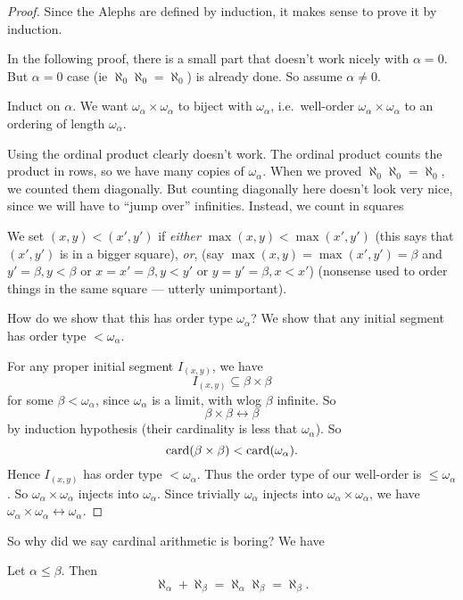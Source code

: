 \documentclass[a4paper]{article}
\begin{document}
\begin{proof}
  Since the Alephs are defined by induction, it makes sense to prove it by induction.

  In the following proof, there is a small part that doesn't work nicely with $\alpha = 0$. But $\alpha = 0$ case (ie $\aleph_0\aleph_0 = \aleph_0$) is already done. So assume $\alpha \not= 0$.

  Induct on $\alpha$. We want $\omega_\alpha \times \omega_\alpha$ to biject with $\omega_\alpha$, i.e.\ well-order $\omega_\alpha \times \omega_\alpha$ to an ordering of length $\omega_\alpha$.

  Using the ordinal product clearly doesn't work. The ordinal product counts the product in rows, so we have many copies of $\omega_\alpha$. When we proved $\aleph_0\aleph_0 = \aleph_0$, we counted them diagonally. But counting diagonally here doesn't look very nice, since we will have to ``jump over'' infinities. Instead, we count in squares
  \begin{center}
  \end{center}
  We set $(x, y) < (x', y')$ if \emph{either} $\max(x, y) < \max(x', y')$ (this says that $(x', y')$ is in a bigger square), \emph{or}, (say $\max(x, y) = \max(x', y') = \beta$ and $y' = \beta, y < \beta$ or $x = x' = \beta, y < y'$ or $y = y' = \beta, x < x'$) (nonsense used to order things in the same square --- utterly unimportant).

  How do we show that this has order type $\omega_\alpha$? We show that any initial segment has order type $ < \omega_\alpha$.

  For any proper initial segment $I_{(x, y)}$, we have
  \[
    I_{(x, y)} \subseteq \beta\times \beta
  \]
  for some $\beta < \omega_\alpha$, since $\omega_\alpha$ is a limit, with wlog $\beta$ infinite. So
  \[
    \beta\times \beta \leftrightarrow \beta
  \]
  by induction hypothesis (their cardinality is less that $\omega_\alpha$). So
  \[
    \operatorname{card}(\beta\times \beta) < \operatorname{card}(\omega_\alpha).
  \]
  Hence $I_{(x, y)}$ has order type $ < \omega_\alpha$. Thus the order type of our well-order is $\leq \omega_\alpha$. So $\omega_\alpha \times \omega_\alpha$ injects into $\omega_\alpha$. Since trivially $\omega_\alpha$ injects into $\omega_\alpha \times \omega_\alpha$, we have $\omega_\alpha \times \omega_\alpha \leftrightarrow \omega_\alpha$.
\end{proof}
So why did we say cardinal arithmetic is boring? We have
\begin{cor}
  Let $\alpha \leq \beta$. Then
  \[
    \aleph_\alpha + \aleph_\beta = \aleph_\alpha\aleph_\beta = \aleph_\beta.
  \]
\end{cor}
\end{document}
